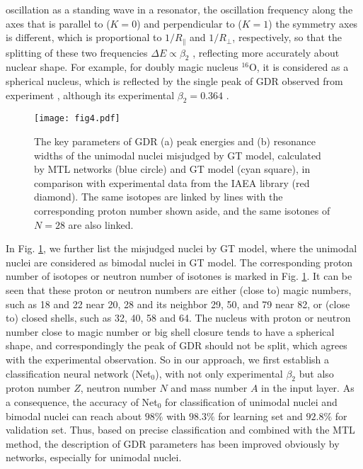 \documentclass[twocolumn,showpacs,superscriptaddress,amsmath,amssymb,prc,preprintnumbers]{revtex4-1}
\begin{document}
oscillation as a standing wave in a resonator, the oscillation frequency along the axes that is parallel to ($K=0$)  and perpendicular to ($K=1$) the symmetry axes is different, which is proportional to $1/R_{\rVert}$ and $1/R_{\perp}$, respectively, so that the splitting of these two frequencies $\Delta E \propto \beta_2$ \cite{Harakeh2001, Speth1981}, reflecting more accurately about nuclear shape. For example, for doubly magic nucleus $^{16}$O, it is considered as a spherical nucleus, which is reflected by the single peak of GDR observed from experiment \cite{Plujko2018}, although its experimental $\beta_2=0.364$ \cite{RIPL3}.

\begin{figure}[htbp]\setlength{\abovecaptionskip}{0.0em}
\texttt{[image: fig4.pdf]}
\caption{The key parameters of GDR (a) peak energies and (b) resonance widths of the unimodal nuclei misjudged by GT model,  calculated by MTL networks (blue circle) and GT model \cite{RIPL3} (cyan square), in comparison with experimental data from the IAEA library \cite{Plujko2018} (red diamond). The same isotopes are linked by lines with the corresponding proton number shown aside, and the same isotones of $N=28$ are also linked. }\label{fig:fig4}
\end{figure}

In Fig. \ref{fig:fig4}, we further list the misjudged nuclei by GT model, where the unimodal nuclei are considered as bimodal nuclei in GT model. The corresponding proton number of isotopes or neutron number of isotones is marked in Fig. \ref{fig:fig4}. It can be seen that these proton or neutron numbers are either (close to) magic numbers, such as 18 and 22 near 20, 28 and its neighbor 29, 50, and 79 near 82, or (close to) closed shells, such as 32, 40, 58 and 64. The nucleus with proton or neutron number close to magic number or big shell closure tends to have a spherical shape, and correspondingly the peak of GDR should not be split, which agrees with the experimental observation. So in our approach, we first establish a classification neural network (Net$_0$), with not only experimental $\beta_2$  but also  proton number $Z$, neutron number $N$ and mass number $A$ in the input layer.  As a consequence, the accuracy of Net$_0$ for classification of unimodal nuclei and bimodal nuclei can reach about $98\%$ with $98.3\%$ for learning set and $92.8\%$ for validation set. Thus, based on precise classification and combined with the MTL method, the description of GDR parameters has been improved obviously by networks, especially for unimodal nuclei.
\end{document}

